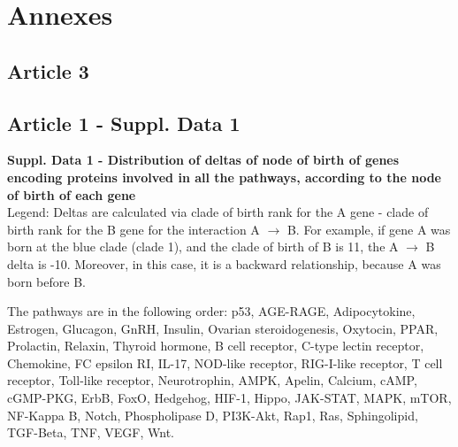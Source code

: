 \chapter[Annexes]{Annexes}
\thispagestyle{firstpage}

\minitoc
\newpage

\section{Article 3}\label{article3}


\section{Article 1 - Suppl. Data 1}
\textbf{Suppl. Data 1 - Distribution of deltas of node of birth of genes encoding proteins involved in all the pathways, according to the node of birth of each gene}\\
Legend: Deltas are calculated via clade of birth rank for the A gene - clade of birth rank for the B gene for the interaction A $\rightarrow$ B. For example, if gene A was born at the blue clade (clade 1), and the clade of birth of B is 11, the A $\rightarrow$ B delta is -10. Moreover, in this case, it is a backward relationship, because A was born before B.
\par The pathways are in the following order:
p53, AGE-RAGE, Adipocytokine, Estrogen, Glucagon, GnRH, Insulin, Ovarian steroidogenesis, Oxytocin, PPAR, Prolactin, Relaxin, Thyroid hormone, B cell receptor, C-type lectin receptor, Chemokine, FC epsilon RI, IL-17, NOD-like receptor, RIG-I-like receptor, T cell receptor, Toll-like receptor, Neurotrophin, AMPK, Apelin, Calcium, cAMP, cGMP-PKG, ErbB, FoxO, Hedgehog, HIF-1, Hippo, JAK-STAT, MAPK, mTOR, NF-Kappa B, Notch, Phospholipase D, PI3K-Akt, Rap1, Ras, Sphingolipid, TGF-Beta, TNF, VEGF, Wnt.



